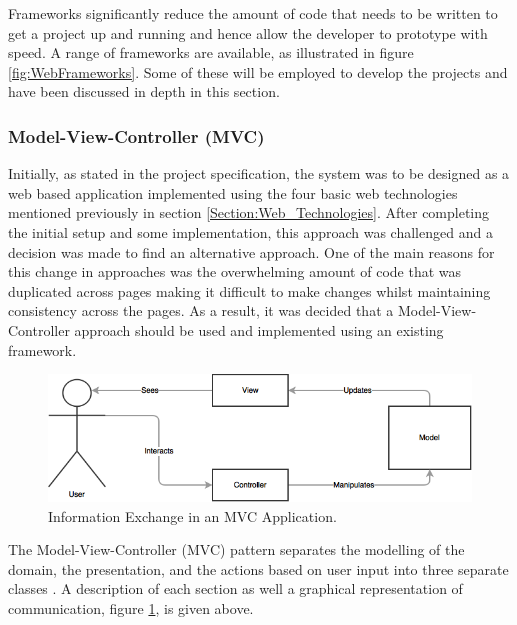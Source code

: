 Frameworks significantly reduce the amount of code that needs to be written to get a project up and running and hence allow the developer to prototype with speed. A range of frameworks are available, as illustrated in figure \ref{fig:WebFrameworks}. Some of these will be employed to develop the projects and have been discussed in depth in this section.

\subsubsection{Model-View-Controller (MVC)}
Initially, as stated in the project specification, the system was to be designed as a web based application implemented using the four basic web technologies mentioned previously in section \ref{Section:Web_Technologies}. After completing the initial setup and some implementation, this approach was challenged and a decision was made to find an alternative approach. One of the main reasons for this change in approaches was the overwhelming amount of code that was duplicated across pages making it difficult to make changes whilst maintaining consistency across the pages. As a result, it was decided that a Model-View-Controller approach should be used and implemented using an existing framework.

\begin{figure}[H]
  \centering
  \includegraphics[width=1.0\textwidth]{Images/Research/Technologies/MVC}
  \caption{Information Exchange in an MVC Application.} \label{fig:MVC} 
\end{figure}

The Model-View-Controller (MVC) pattern separates the modelling of the domain, the presentation, and the actions based on user input into three separate classes \cite{MSDN:MVC}. A description of each section as well a graphical representation of communication, figure \ref{fig:MVC}, is given above.

